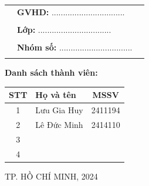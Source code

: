 \documentclass[a4paper]{article}
\theoremstyle{definition}
\begin{document}
\begin{titlepage}
\begin{center}
\begin{tabular}{c}
\end{tabular}
\end{center}
\vspace{0.5cm}
\begin{table}[h]
\begin{tabular}{rll}
\hspace{2 cm} &  \textbf{\Large GVHD:} {\Large ................................}
\\
\\
\hspace{2 cm} &   \textbf{\Large Lớp:} {\Large ................................}
\\
\\
\hspace{2 cm}  &   \textbf{\Large Nhóm số:} {\Large ................................}
\\
\\
\end{tabular}
\end{table}

\begin{center}
\vspace{0.5cm}

\textbf{\large Danh sách thành viên:}

\vspace{0.5cm}

\renewcommand{\arraystretch}{2}
\begin{tabular}{|c|m{8cm}|c|}
    \hline
    \textbf{STT} & \textbf{Họ và tên} & \textbf{MSSV} \\
    \hline
    1 & Lưu Gia Huy & 2411194\\
    \hline
    2 & Lê Đức Minh & 2414110\\
    \hline
    3 & & \\
    \hline
    4 & & \\
    \hline
\end{tabular}
\end{center}


\vspace{0.5cm}
\begin{center}
{\Large TP. HỒ CHÍ MINH, 2024 }
\end{center}
\end{titlepage}
\newpage



\newpage
\tableofcontents
\newpage
\listoffigures
\newpage
\listoftables
\newpage
\setcounter{page}{1}


\newpage

\newpage

\newpage


\newpage

\end{document}
